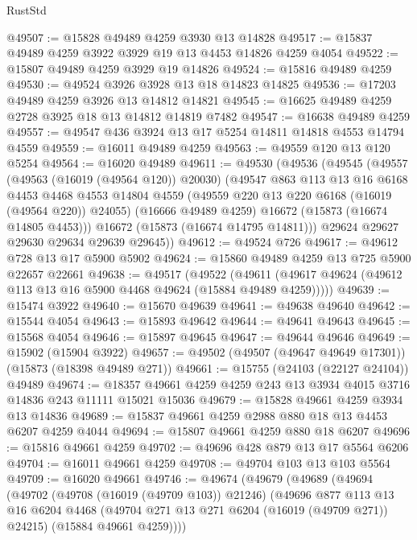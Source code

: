 \begin{lexlean}{RustStd}
\begin{coremodule}
@49507 := @15828 @49489 @4259 @3930 @13 @14828
@49517 := @15837 @49489 @4259 @3922 @3929 @19 @13 @4453 @14826 @4259 @4054
@49522 := @15807 @49489 @4259 @3929 @19 @14826
@49524 := @15816 @49489 @4259
@49530 := @49524 @3926 @3928 @13 @18 @14823 @14825
@49536 := @17203 @49489 @4259 @3926 @13 @14812 @14821
@49545 := @16625 @49489 @4259 @2728 @3925 @18 @13 @14812 @14819 @7482
@49547 := @16638 @49489 @4259
@49557 := @49547 @436 @3924 @13 @17 @5254 @14811 @14818 @4553 @14794 @4559
@49559 := @16011 @49489 @4259
@49563 := @49559 @120 @13 @120 @5254
@49564 := @16020 @49489
@49611 := @49530
    (@49536
      (@49545
        (@49557
          (@49563 (@16019 (@49564 @120)) @20030)
          (@49547
            @863
            @113
            @13
            @16
            @6168
            @4453
            @4468
            @4553
            @14804
            @4559
            (@49559 @220 @13 @220 @6168 (@16019 (@49564 @220)) @24055)
            (@16666 @49489 @4259)
            @16672
            (@15873 (@16674 @14805 @4453)))
          @16672
          (@15873 (@16674 @14795 @14811)))
        @29624
        @29627
        @29630
        @29634
        @29639
        @29645))
@49612 := @49524 @726
@49617 := @49612 @728 @13 @17 @5900 @5902
@49624 := @15860 @49489 @4259 @13 @725 @5900 @22657 @22661
@49638 := @49517
    (@49522 (@49611 (@49617 @49624 (@49612 @113 @13 @16 @5900 @4468 @49624 (@15884 @49489 @4259)))))
@49639 := @15474 @3922
@49640 := @15670 @49639
@49641 := @49638 @49640
@49642 := @15544 @4054
@49643 := @15893 @49642
@49644 := @49641 @49643
@49645 := @15568 @4054
@49646 := @15897 @49645
@49647 := @49644 @49646
@49649 := @15902 (@15904 @3922)
@49657 := @49502 (@49507 (@49647 @49649 @17301)) (@15873 (@18398 @49489 @271))
@49661 := @15755 (@24103 (@22127 @24104)) @49489
@49674 := @18357 @49661 @4259 @4259 @243 @13 @3934 @4015 @3716 @14836 @243 @11111 @15021 @15036
@49679 := @15828 @49661 @4259 @3934 @13 @14836
@49689 := @15837 @49661 @4259 @2988 @880 @18 @13 @4453 @6207 @4259 @4044
@49694 := @15807 @49661 @4259 @880 @18 @6207
@49696 := @15816 @49661 @4259
@49702 := @49696 @428 @879 @13 @17 @5564 @6206
@49704 := @16011 @49661 @4259
@49708 := @49704 @103 @13 @103 @5564
@49709 := @16020 @49661
@49746 := @49674
    (@49679
      (@49689
        (@49694
          (@49702
            (@49708 (@16019 (@49709 @103)) @21246)
            (@49696
              @877
              @113
              @13
              @16
              @6204
              @4468
              (@49704 @271 @13 @271 @6204 (@16019 (@49709 @271)) @24215)
              (@15884 @49661 @4259))))

\end{coremodule}
\end{lexlean}
